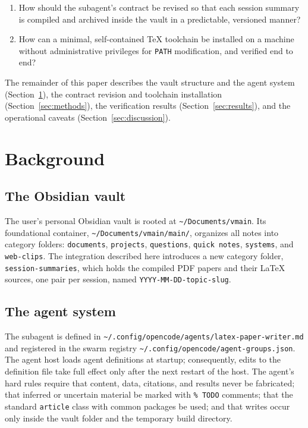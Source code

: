 \documentclass[11pt]{article}
\begin{document}
\begin{enumerate}
  \item[(i)] How should the subagent's contract be revised so that each session summary is compiled and archived inside the vault in a predictable, versioned manner?
  \item[(ii)] How can a minimal, self-contained \TeX{} toolchain be installed on a machine without administrative privileges for \texttt{PATH} modification, and verified end to end?
\end{enumerate}

The remainder of this paper describes the vault structure and the agent system (Section~\ref{sec:background}), the contract revision and toolchain installation (Section~\ref{sec:methods}), the verification results (Section~\ref{sec:results}), and the operational caveats (Section~\ref{sec:discussion}).

\section{Background}
\label{sec:background}

\subsection{The Obsidian vault}
\label{sec:vault}

The user's personal Obsidian vault is rooted at \texttt{\textasciitilde/Documents/vmain}. Its foundational container, \texttt{\textasciitilde/Documents/vmain/main/}, organizes all notes into category folders: \texttt{documents}, \texttt{projects}, \texttt{questions}, \texttt{quick notes}, \texttt{systems}, and \texttt{web-clips}. The integration described here introduces a new category folder, \texttt{session-summaries}, which holds the compiled PDF papers and their \LaTeX{} sources, one pair per session, named \texttt{YYYY-MM-DD-\allowbreak topic-slug}.

\subsection{The agent system}
\label{sec:agents}

The subagent is defined in \texttt{\textasciitilde/.config/opencode/agents/latex-paper-writer.md} and registered in the swarm registry \texttt{\textasciitilde/.config/opencode/agent-groups.json}. The agent host loads agent definitions at startup; consequently, edits to the definition file take full effect only after the next restart of the host. The agent's hard rules require that content, data, citations, and results never be fabricated; that inferred or uncertain material be marked with \texttt{\% TODO} comments; that the standard \texttt{article} class with common packages be used; and that writes occur only inside the vault folder and the temporary build directory.
\end{document}
